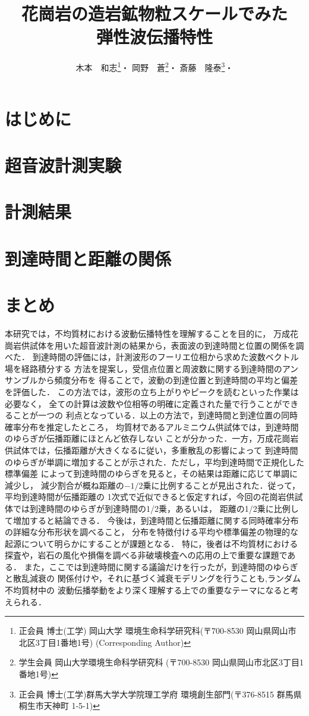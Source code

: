 \documentclass{jsce}
\title{
	花崗岩の造岩鉱物粒スケールでみた\\
	弾性波伝播特性
}%
\author{木本　和志\thanks{正会員 博士(工学) 岡山大学 環境生命科学研究科(〒700-8530 岡山県岡山市北区3丁目1番地1号)\email{kimoto@okayama-u.ac.jp} (Corresponding Author)}・
岡野　蒼\thanks{学生会員 岡山大学環境生命科学研究科 (〒700-8530 岡山県岡山市北区3丁目1番地1号)}・
斎藤　隆泰\thanks{正会員 博士(工学)群馬大学大学院理工学府 環境創生部門(〒376-8515 群馬県桐生市天神町 1-5-1)}・
}
\begin{document}
\maketitle
\section{はじめに}
	
\section{超音波計測実験}
	
\section{計測結果}
%	
\section{到達時間と距離の関係 }
%	
\section{まとめ}
本研究では，不均質材における波動伝播特性を理解することを目的に，
万成花崗岩供試体を用いた超音波計測の結果から，表面波の到達時間と位置の関係を調べた．
到達時間の評価には，計測波形のフーリエ位相から求めた波数ベクトル場を経路積分する
方法を提案し，受信点位置と周波数に関する到達時間のアンサンブルから頻度分布を
得ることで，波動の到達位置と到達時間の平均と偏差を評価した．
この方法では，波形の立ち上がりやピークを読むといった作業は必要なく，
全ての計算は波数や位相等の明確に定義された量で行うことができることが一つの
利点となっている．以上の方法で，到達時間と到達位置の同時確率分布を推定したところ，
均質材であるアルミニウム供試体では，到達時間のゆらぎが伝播距離にほとんど依存しない
ことが分かった．一方，万成花崗岩供試体では，伝播距離が大きくなるに従い，多重散乱の影響によって
到達時間のゆらぎが単調に増加することが示された．ただし，平均到達時間で正規化した標準偏差
によって到達時間のゆらぎを見ると，その結果は距離に応じて単調に減少し，
減少割合が概ね距離の$-1/2$乗に比例することが見出された．従って，平均到達時間が伝播距離の
1次式で近似できると仮定すれば，今回の花崗岩供試体では到達時間のゆらぎが到達時間の1/2乗，あるいは，
距離の1/2乗に比例して増加すると結論できる．
今後は，到達時間と伝播距離に関する同時確率分布の詳細な分布形状を調べること，
分布を特徴付ける平均や標準偏差の物理的な起源について明らかにすることが課題となる．
特に，後者は不均質材における探査や，岩石の風化や損傷を調べる非破壊検査への応用の上で重要な課題である．
また，ここでは到達時間に関する議論だけを行ったが，到達時間のゆらぎと散乱減衰の
関係付けや，それに基づく減衰モデリングを行うことも,ランダム不均質材中の
波動伝播挙動をより深く理解する上での重要なテーマになると考えられる．
\\
\end{document}
